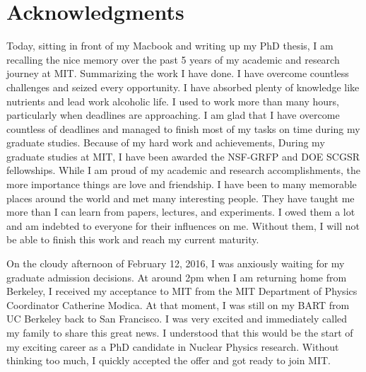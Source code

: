 \cleardoublepage
\setcounter{savepage}{\thepage}
\begin{abstractpage}

\end{abstractpage}

% 

\cleardoublepage

\section*{Acknowledgments}


Today, sitting in front of my Macbook and writing up my PhD thesis, I am recalling the nice memory over the past 5 years of my academic and research journey at MIT. Summarizing the work I have done. I have overcome countless challenges and seized every opportunity. I have absorbed plenty of knowledge like nutrients and lead work alcoholic life. I used to work more than many hours, particularly when deadlines are approaching. I am glad that I have overcome countless of deadlines and managed to finish most of my tasks on time during my graduate studies. Because of my hard work and achievements, During my graduate studies at MIT, I have been awarded the NSF-GRFP and DOE SCGSR fellowships. While I am proud of my academic and research accomplishments, the more importance things are love and friendship. I have been to many memorable places around the world and met many interesting people. They have taught me more than I can learn from papers, lectures, and experiments. I owed them a lot and am indebted to everyone for their influences on me. Without them, I will not be able to finish this work and reach my current maturity.

On the cloudy afternoon of February 12, 2016, I was anxiously waiting for my graduate admission decisions. At around 2pm when I am returning home from Berkeley, I received my acceptance to MIT from the MIT Department of Physics Coordinator Catherine Modica. At that moment, I was still on my BART from UC Berkeley back to San Francisco. I was very excited and immediately called my family to share this great news. I understood that this would be the start of my exciting career as a PhD candidate in Nuclear Physics research. Without thinking too much, I quickly accepted the offer and got ready to join MIT.


